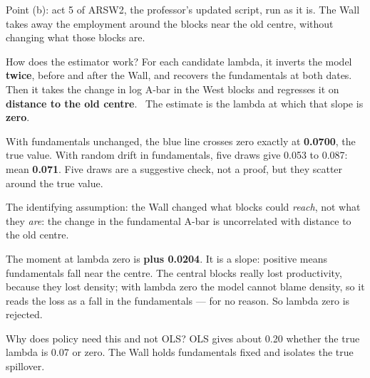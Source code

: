 \begin{say}
 Point (b): act 5 of ARSW2, the professor's updated script, run as it is. The Wall takes away the employment around the blocks near the old centre, without changing what those blocks are.

How does the estimator work? For each candidate lambda, it inverts the model \textbf{twice}, before and after the Wall, and recovers the fundamentals at both dates. Then it takes the change in log A-bar in the West blocks and regresses it on \textbf{distance to the old centre}. \pause\ The estimate is the lambda at which that slope is \textbf{zero}.

 With fundamentals unchanged, the blue line crosses zero exactly at \textbf{0.0700}, the true value.  With random drift in fundamentals, five draws give 0.053 to 0.087: mean \textbf{0.071}. Five draws are a suggestive check, not a proof, but they scatter around the true value.

 The identifying assumption: the Wall changed what blocks could \emph{reach}, not what they \emph{are}: the change in the fundamental A-bar is uncorrelated with distance to the old centre.

 The moment at lambda zero is \textbf{plus 0.0204}. It is a slope: positive means fundamentals fall near the centre. The central blocks really lost productivity, because they lost density; with lambda zero the model cannot blame density, so it reads the loss as a fall in the fundamentals --- for no reason. So lambda zero is rejected.

 Why does policy need this and not OLS? OLS gives about 0.20 whether the true lambda is 0.07 or zero. The Wall holds fundamentals fixed and isolates the true spillover.
\end{say}

